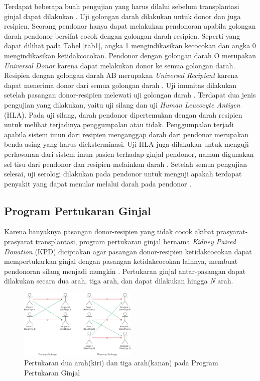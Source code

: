 \documentclass[conference]{IEEEtran}
\begin{document}
Terdapat beberapa buah pengujian yang harus dilalui sebelum transplantasi ginjal dapat dilakukan \cite{adrian}.
Uji golongan darah dilakukan untuk donor dan juga resipien. Seorang pendonor hanya dapat melakukan pendonoran apabila
golongan darah pendonor bersifat cocok dengan golongan darah resipien. Seperti yang dapat dilihat pada Tabel \ref{tab1},
angka 1 mengindikasikan kecocokan dan angka 0 mengindikasikan ketidakcocokan. Pendonor dengan golongan darah O merupakan
\textit{Universal Donor} karena dapat melakukan donor ke semua golongan darah. Resipien dengan golongan darah AB merupakan
\textit{Universal Recipient} karena dapat menerima donor dari semua golongan darah \cite{charge}.
Uji imunitas dilakukan setelah pasangan donor-resipien melewati uji golongan darah \cite{adrian}. Terdapat dua jenis
pengujian yang dilakukan, yaitu uji silang dan uji \textit{Human Leucocyte Antigen} (HLA). Pada uji silang, darah pendonor
dipertemukan dengan darah resipien untuk melihat terjadinya penggumpalan atau tidak. Penggumpalan terjadi apabila sistem imun
dari resipien menganggap darah dari pendonor merupakan benda asing yang harus dieksterminasi\cite{aprilano}. Uji HLA juga
dilakukan untuk menguji perlawanan dari sistem imun pasien terhadap ginjal pendonor, namun digunakan sel tisu dari pendonor
dan resipien melainkan darah \cite{nguyen}. Setelah semua pengujian selesai, uji serologi dilakukan pada pendonor untuk
menguji apakah terdapat penyakit yang dapat menular melalui darah pada pendonor \cite{aprilano}.

\subsection{Program Pertukaran Ginjal}
Karena banyaknya pasangan donor-resipien yang tidak cocok akibat prasyarat-prasyarat transplantasi, program pertukaran
ginjal bernama \textit{Kidney Paired Donation} (KPD) diciptakan agar pasangan donor-resipien ketidakcocokan dapat mempertukarkan
ginjal dengan pasangan ketidakcocokan lainnya, membuat pendonoran silang menjadi mungkin \cite{raja}. Pertukaran ginjal
antar-pasangan dapat dilakukan secara dua arah, tiga arah, dan dapat dilakukan hingga \textit{N} arah.

\begin{figure}
    \includegraphics[width=0.5\textwidth]{images/kidney-exchange.png}
    \caption{Pertukaran dua arah(kiri) dan tiga arah(kanan) pada Program Pertukaran Ginjal}
\end{figure}
\end{document}
